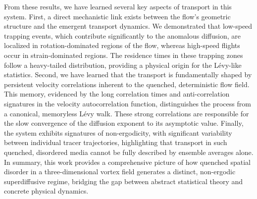 \documentclass[]{article}
\begin{document}
From these results, we have learned several key aspects of transport in this system. First, a direct mechanistic link exists between the flow's geometric structure and the emergent transport dynamics. We demonstrated that low-speed trapping events, which contribute significantly to the anomalous diffusion, are localized in rotation-dominated regions of the flow, whereas high-speed flights occur in strain-dominated regions. The residence times in these trapping zones follow a heavy-tailed distribution, providing a physical origin for the Lévy-like statistics. Second, we have learned that the transport is fundamentally shaped by persistent velocity correlations inherent to the quenched, deterministic flow field. This memory, evidenced by the long correlation times and anti-correlation signatures in the velocity autocorrelation function, distinguishes the process from a canonical, memoryless Lévy walk. These strong correlations are responsible for the slow convergence of the diffusion exponent to its asymptotic value. Finally, the system exhibits signatures of non-ergodicity, with significant variability between individual tracer trajectories, highlighting that transport in such quenched, disordered media cannot be fully described by ensemble averages alone. In summary, this work provides a comprehensive picture of how quenched spatial disorder in a three-dimensional vortex field generates a distinct, non-ergodic superdiffusive regime, bridging the gap between abstract statistical theory and concrete physical dynamics.


{}

\end{document}
